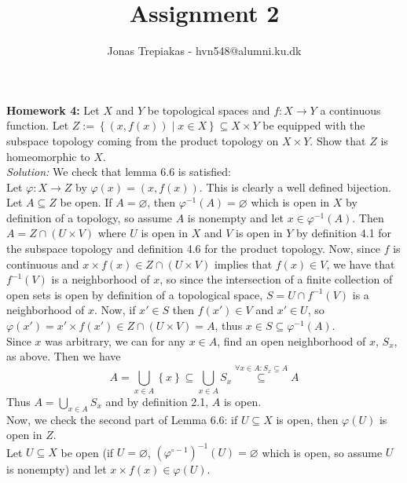 \documentclass[a4paper]{article}
\title{Assignment 2}
\author{Jonas Trepiakas - hvn548@alumni.ku.dk}
\date{}
\begin{document}
\maketitle
\newpage
    \textbf{Homework 4:} Let $X$ and $Y$ be topological spaces and $f  \colon
    X \to  Y$ a continuous function. Let $Z := \left\{ (x, f(x))  \mid 
    x \in X \right\} \subseteq X \times Y$ be equipped with the subspace
    topology coming from the product topology on $X \times Y$. Show that $Z$ is
    homeomorphic to $X$.\\
    \linebreak
    \textit{Solution:} We check that lemma 6.6 is satisfied:\\
    Let $\varphi  \colon X \to Z$ by $\varphi (x) =
    (x, f(x))$. This is clearly a well
    defined bijection. Let $A \subseteq Z$ be open. If $A =\varnothing$, then
    $\varphi^{-1}(A) = \varnothing$ which is open in $X$ by definition of
    a topology, so assume $A$ is nonempty and let 
    $x \in \varphi^{-1} (A)$. Then $A = Z \cap (U \times V)$ where $U$ is open
    in $X$ and $V$ is open in $Y$ by definition 4.1 for the subspace topology
    and definition 4.6 for the product topology.
    Now, since $f$ is continuous and $x \times f(x) \in Z \cap \left( U \times
    V\right)$ implies that $f(x) \in V$, we have that
    $f^{-1}(V)$ is a neighborhood of $x$, so since the intersection of a finite
    collection of open sets is open by definition of a topological space,
    $S = U \cap f^{-1}(V)$ is a neighborhood
    of $x$. Now, if $x' \in S$ then $f(x') \in V$ and $x' \in U$, so
    $\varphi(x') = x' \times f(x') \in Z \cap (U \times V) = A$, thus
    $x \in S \subseteq \varphi^{-1}(A)$.\\
    Since $x$ was arbitrary, we can for any $x \in A$, find an open
    neighborhood of $x$, $S_x$, as above. Then we have
    \[
    A = \bigcup_{x \in A} \left\{ x \right\} 
    \subseteq \bigcup_{x \in A} S_x
    \stackrel{\forall x \in A \colon S_x \subseteq A}{\subseteq} A
    \] 
    Thus $A = \bigcup_{x \in A} S_x$ and by definition 2.1, $A$ is open.\\
    \linebreak
    Now, we check the second part of Lemma 6.6: if $U \subseteq X$ is open,
    then $\varphi(U)$ is open in $Z$.\\
    \linebreak
    Let $U \subseteq X$ be open (if $U =\varnothing$, $(\varphi^{\circ -1})^{-1}(U)
    = \varnothing$ which is open, so assume $U$ is nonempty)
    and let $x \times f(x) \in \varphi(U)$.
\end{document}
